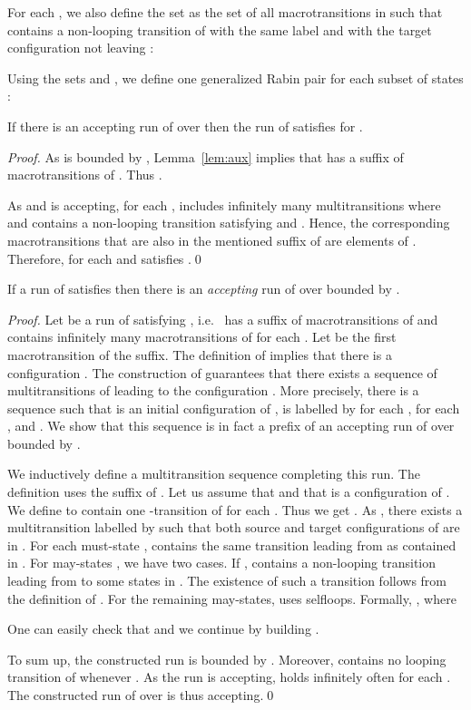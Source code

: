 \documentclass{llncs}
\begin{document}
For each , we also define the set  as the set of all
macrotransitions in  such that  contains a non-looping
transition of  with the same label and with the target configuration not
leaving :


Using the sets  and , we define one generalized Rabin pair
 for each subset of states :


\begin{lemma}\label{lem:ag}
If there is an accepting run  of  over  then the run 
 of  satisfies  for .
\end{lemma}
\begin{proof}
  As  is bounded by , Lemma~\ref{lem:aux} implies that 
  has a suffix  of macrotransitions of . Thus
  .

  As  and  is accepting, for each ,  includes infinitely many multitransitions  where
   and  contains a non-looping transition
   satisfying  and . Hence,
  the corresponding macrotransitions  that are also in the mentioned
  suffix  of  are elements of .
  Therefore,  for each  and  satisfies .\qed
\end{proof}

\begin{lemma}\label{lem:ga}
If a run  of  satisfies  then there is
an \emph{accepting} run of  over  bounded by .
\end{lemma}
\begin{proof}
  Let  be a run of  satisfying ,
  i.e.~ has a suffix of macrotransitions of  and
   contains infinitely many macrotransitions of  for
  each .  Let  be the first
  macrotransition of the suffix.  The definition of  implies that
  there is a configuration .  The construction of
   guarantees that there exists a sequence of multitransitions of 
  leading to the configuration . More precisely, there is a sequence
   such that  is an initial configuration of
  ,  is labelled by  for each ,
   for each , and .  We
  show that this sequence is in fact a prefix of an accepting run of 
  over  bounded by . 

  We inductively define a multitransition sequence 
  completing this run.  The definition uses the suffix
   of .  Let us assume that  and that
   is a configuration of .  We define  to
  contain one -transition of  for each .  Thus
  we get .  As , there exists a
  multitransition  labelled by  such that both source and target
  configurations of  are in .  For each must-state
  ,  contains the same transition leading from 
  as contained in .  For may-states , we have two
  cases.  If ,  contains a non-looping transition
  leading from  to some states in .  The existence of such a
  transition follows from the definition of .  For the remaining
  may-states,  uses selfloops.
Formally, , where

One can easily check that  and we continue by building
.  

To sum up, the constructed run is bounded by .  Moreover,  contains
no looping transition of  whenever . As the run
 is accepting,  holds infinitely often for each
. The constructed run of  over  is thus accepting.\qed
\end{proof}
\end{document}
